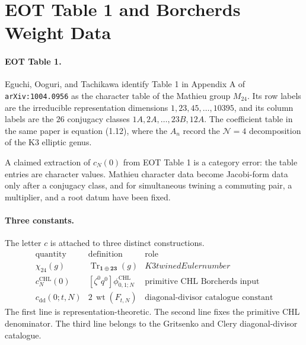 \providecommand{\kBKM}{\kappa_{\mathrm{BKM}}}
\providecommand{\kcat}{\kappa_{\mathrm{cat}}}
\providecommand{\kch}{\kappa_{\mathrm{ch}}}
\providecommand{\kchHeis}{\kappa_{\mathrm{ch}}^{\mathrm{Heis}}}
\providecommand{\kfiber}{\kappa_{\mathrm{fiber}}}
\providecommand{\PhiCHL}[1]{\Phi_{#1}^{\mathrm{CHL}}}

\section*{EOT Table 1 and Borcherds Weight Data}

\paragraph{EOT Table 1.}
Eguchi, Ooguri, and Tachikawa identify Table 1 in Appendix A of
\texttt{arXiv:1004.0956} as the character table of the Mathieu group
\(M_{24}\). Its row labels are the irreducible representation dimensions
\(1,23,45,\ldots,10395\), and its column labels are the \(26\)
conjugacy classes \(1A,2A,\ldots,23B,12A\). The coefficient table in
the same paper is equation (1.12), where the \(A_n\) record the
\(\mathcal N=4\) decomposition of the K3 elliptic genus.

A claimed extraction of \(c_N(0)\) from EOT Table 1 is a category error:
the table entries are character values. Mathieu character data become
Jacobi-form data only after a conjugacy class, and for simultaneous
twining a commuting pair, a multiplier, and a root datum have been fixed.

\paragraph{Three constants.}
The letter \(c\) is attached to three distinct constructions.
\[
\begin{array}{c|c|c}
\text{quantity} & \text{definition} & \text{role}\\ \hline
\chi_{24}(g) & \operatorname{Tr}_{\mathbf 1\oplus\mathbf {23}}(g)
& K3 twined Euler number\\
c_N^{\mathrm{CHL}}(0) & [\zeta^0q^0]\phi^{\mathrm{CHL}}_{0,1;N}
& \text{primitive CHL Borcherds input}\\
c_{\mathrm{dd}}(0;t,N) & 2\,\operatorname{wt}(F_{t,N})
& \text{diagonal-divisor catalogue constant}
\end{array}
\]
The first line is representation-theoretic. The second line fixes the
primitive CHL denominator. The third line belongs to the Gritsenko and
Clery diagonal-divisor catalogue.

